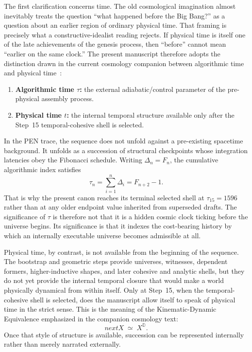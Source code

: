 \documentclass[11pt,a4paper]{article}
\def\bigcirc{next}%
\theoremstyle{plain}
\theoremstyle{definition}
\theoremstyle{remark}
\newcommand{\D}{\mathbb{D}}
\newcommand{\nextmod}{\bigcirc}
\begin{document}
The first clarification concerns time.
The old cosmological imagination almost inevitably treats the question ``what happened before the Big Bang?'' as a question about an earlier region of ordinary physical time.
That framing is precisely what a constructive-idealist reading rejects.
If physical time is itself one of the late achievements of the genesis process, then ``before'' cannot mean ``earlier on the same clock.''
The present manuscript therefore adopts the distinction drawn in the current cosmology companion between algorithmic time and physical time~\cite{abb}:
\begin{enumerate}[nosep]
    \item \textbf{Algorithmic time $\tau$:} the external adiabatic/control parameter of the pre-physical assembly process.
    \item \textbf{Physical time $t$:} the internal temporal structure available only after the Step~15 temporal-cohesive shell is selected.
\end{enumerate}

In the PEN trace, the sequence does not unfold against a pre-existing spacetime background.
It unfolds as a succession of structural checkpoints whose integration latencies obey the Fibonacci schedule.
Writing $\Delta_n = F_n$, the cumulative algorithmic index satisfies
\begin{equation}
\label{eq:tau-schedule}
    \tau_n = \sum_{i=1}^{n}\Delta_i = F_{n+2} - 1.
\end{equation}
That is why the present canon reaches its terminal selected shell at $\tau_{15} = 1596$ rather than at any older endpoint value inherited from superseded drafts.
The significance of $\tau$ is therefore not that it is a hidden cosmic clock ticking before the universe begins.
Its significance is that it indexes the cost-bearing history by which an internally executable universe becomes admissible at all.

Physical time, by contrast, is not available from the beginning of the sequence.
The bootstrap and geometric steps provide universes, witnesses, dependent formers, higher-inductive shapes, and later cohesive and analytic shells, but they do not yet provide the internal temporal closure that would make a world physically dynamical from within itself.
Only at Step~15, when the temporal-cohesive shell is selected, does the manuscript allow itself to speak of physical time in the strict sense.
This is the meaning of the Kinematic-Dynamic Equivalence emphasized in the companion cosmology text:
\begin{equation}
\label{eq:section3-kde}
    \nextmod X \;\simeq\; X^{\D}.
\end{equation}
Once that style of structure is available, succession can be represented internally rather than merely narrated externally.
\end{document}
